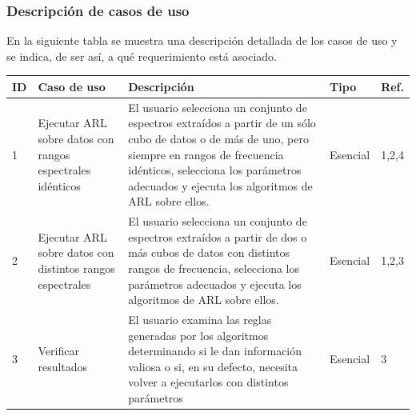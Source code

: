\subsubsection{Descripción de casos de uso}

En la siguiente tabla se muestra una descripción detallada de los casos de uso y se indica, de ser así, a qué requerimiento está asociado.

\begin{tabular}{|l|p{4cm}|p{7cm}|l|l|}
	\hline
	ID & Caso de uso & Descripción & Tipo & Ref. \\ \hline
	1 & Ejecutar ARL sobre datos con rangos espectrales idénticos & El usuario selecciona un conjunto de espectros extraídos a partir de un sólo cubo de datos o de más de uno, pero siempre en rangos de frecuencia idénticos, selecciona los parámetros adecuados y ejecuta los algoritmos de ARL sobre ellos. & Esencial & 1,2,4 \\ \hline
	2 & Ejecutar ARL sobre datos con distintos rangos espectrales & El usuario selecciona un conjunto de espectros extraídos a partir de dos o más cubos de datos con distintos rangos de frecuencia, selecciona los parámetros adecuados y ejecuta los algoritmos de ARL sobre ellos. & Esencial & 1,2,3 \\ \hline
	3 & Verificar resultados & El usuario examina las reglas generadas por los algoritmos determinando si le dan información valiosa o si, en su defecto, necesita volver a ejecutarlos con distintos parámetros & Esencial & 3 \\ \hline
\end{tabular}
